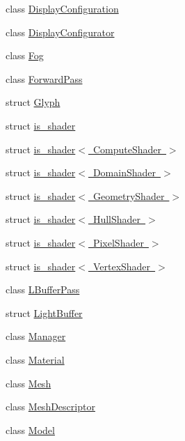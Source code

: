 \begin{DoxyCompactItemize}
\item 
class \mbox{\hyperlink{classmage_1_1rendering_1_1_display_configuration}{Display\+Configuration}}
\item 
class \mbox{\hyperlink{classmage_1_1rendering_1_1_display_configurator}{Display\+Configurator}}
\item 
class \mbox{\hyperlink{classmage_1_1rendering_1_1_fog}{Fog}}
\item 
class \mbox{\hyperlink{classmage_1_1rendering_1_1_forward_pass}{Forward\+Pass}}
\item 
struct \mbox{\hyperlink{structmage_1_1rendering_1_1_glyph}{Glyph}}
\item 
struct \mbox{\hyperlink{structmage_1_1rendering_1_1is__shader}{is\+\_\+shader}}
\item 
struct \mbox{\hyperlink{structmage_1_1rendering_1_1is__shader_3_01_compute_shader_01_4}{is\+\_\+shader$<$ Compute\+Shader $>$}}
\item 
struct \mbox{\hyperlink{structmage_1_1rendering_1_1is__shader_3_01_domain_shader_01_4}{is\+\_\+shader$<$ Domain\+Shader $>$}}
\item 
struct \mbox{\hyperlink{structmage_1_1rendering_1_1is__shader_3_01_geometry_shader_01_4}{is\+\_\+shader$<$ Geometry\+Shader $>$}}
\item 
struct \mbox{\hyperlink{structmage_1_1rendering_1_1is__shader_3_01_hull_shader_01_4}{is\+\_\+shader$<$ Hull\+Shader $>$}}
\item 
struct \mbox{\hyperlink{structmage_1_1rendering_1_1is__shader_3_01_pixel_shader_01_4}{is\+\_\+shader$<$ Pixel\+Shader $>$}}
\item 
struct \mbox{\hyperlink{structmage_1_1rendering_1_1is__shader_3_01_vertex_shader_01_4}{is\+\_\+shader$<$ Vertex\+Shader $>$}}
\item 
class \mbox{\hyperlink{classmage_1_1rendering_1_1_l_buffer_pass}{L\+Buffer\+Pass}}
\item 
struct \mbox{\hyperlink{structmage_1_1rendering_1_1_light_buffer}{Light\+Buffer}}
\item 
class \mbox{\hyperlink{classmage_1_1rendering_1_1_manager}{Manager}}
\item 
class \mbox{\hyperlink{classmage_1_1rendering_1_1_material}{Material}}
\item 
class \mbox{\hyperlink{classmage_1_1rendering_1_1_mesh}{Mesh}}
\item 
class \mbox{\hyperlink{classmage_1_1rendering_1_1_mesh_descriptor}{Mesh\+Descriptor}}
\item 
class \mbox{\hyperlink{classmage_1_1rendering_1_1_model}{Model}}

\end{DoxyCompactItemize}
